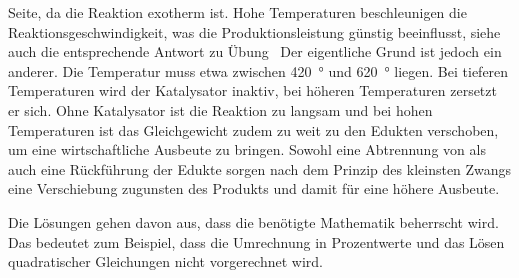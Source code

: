 \documentclass[DIV11]{scrartcl}
\begin{document}
\begin{solution}
\begin{tasks}
      Seite, da die Reaktion exotherm ist.
    \task Hohe Temperaturen beschleunigen die Reaktionsgeschwindigkeit, was
      die Produktionsleistung günstig beeinflusst, siehe auch die entsprechende
      Antwort zu Übung~  Der eigentliche Grund ist
      jedoch ein anderer. Die Temperatur muss etwa zwischen \SI{420}{\degree}
      und \SI{620}{\degree} liegen. Bei tieferen Temperaturen wird der
      Katalysator inaktiv, bei höheren Temperaturen zersetzt er sich.
    \task Ohne Katalysator ist die Reaktion zu langsam  und bei hohen
      Temperaturen ist das Gleichgewicht zudem zu weit zu den Edukten
      verschoben, um eine wirtschaftliche Ausbeute zu bringen.
    \task Sowohl eine Abtrennung von  als auch eine Rückführung der
      Edukte sorgen nach dem Prinzip des kleinsten Zwangs eine Verschiebung
      zugunsten des Produkts und damit für eine höhere Ausbeute.
  \end{tasks}
\end{solution}

\newpage
{}

Die Lösungen gehen davon aus, dass die benötigte Mathematik beherrscht
wird.  Das bedeutet zum Beispiel, dass die Umrechnung in Prozentwerte und das
Lösen quadratischer Gleichungen nicht vorgerechnet wird.

\printsolutions
\end{document}
